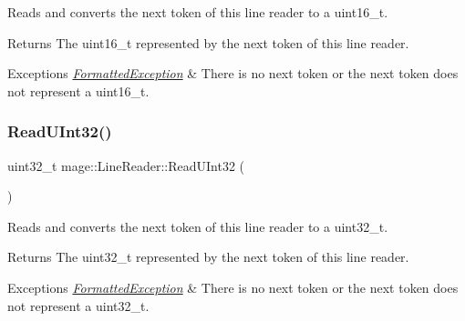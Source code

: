 Reads and converts the next token of this line reader to a {\ttfamily uint16\+\_\+t}.

\begin{DoxyReturn}{Returns}
The {\ttfamily uint16\+\_\+t} represented by the next token of this line reader. 
\end{DoxyReturn}

\begin{DoxyExceptions}{Exceptions}
{\em \hyperlink{structmage_1_1_formatted_exception}{Formatted\+Exception}} & There is no next token or the next token does not represent a {\ttfamily uint16\+\_\+t}. \\
\hline
\end{DoxyExceptions}
\hypertarget{classmage_1_1_line_reader_a82d14aede3b4ebff8cc54345dfba2c4b}{}\label{classmage_1_1_line_reader_a82d14aede3b4ebff8cc54345dfba2c4b} 
\subsubsection{\texorpdfstring{Read\+U\+Int32()}{ReadUInt32()}}
{\footnotesize\ttfamily uint32\+\_\+t mage\+::\+Line\+Reader\+::\+Read\+U\+Int32 (\begin{DoxyParamCaption}{ }\end{DoxyParamCaption})\hspace{0.3cm}{\ttfamily [protected]}}

Reads and converts the next token of this line reader to a {\ttfamily uint32\+\_\+t}.

\begin{DoxyReturn}{Returns}
The {\ttfamily uint32\+\_\+t} represented by the next token of this line reader. 
\end{DoxyReturn}

\begin{DoxyExceptions}{Exceptions}
{\em \hyperlink{structmage_1_1_formatted_exception}{Formatted\+Exception}} & There is no next token or the next token does not represent a {\ttfamily uint32\+\_\+t}. \\
\hline
\end{DoxyExceptions}
\hypertarget{classmage_1_1_line_reader_ac05624eb7a786bfc1391b22095da1e71}{}\label{classmage_1_1_line_reader_ac05624eb7a786bfc1391b22095da1e71} 
